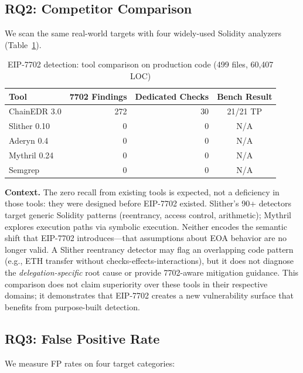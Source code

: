 \subsection{RQ2: Competitor Comparison}

We scan the same real-world targets with four widely-used Solidity analyzers (Table~\ref{tab:competitors}).

\begin{table}[h]
\centering
\caption{EIP-7702 detection: tool comparison on production code (499 files, 60{,}407 LOC)}
\label{tab:competitors}
\begin{tabular}{lrrc}
\hline
\textbf{Tool} & \textbf{7702 Findings} & \textbf{Dedicated Checks} & \textbf{Bench Result} \\
\hline
ChainEDR 3.0    & 272 & 30 & 21/21 TP \\
Slither 0.10    &   0 &  0 & N/A \\
Aderyn 0.4      &   0 &  0 & N/A \\
Mythril 0.24    &   0 &  0 & N/A \\
Semgrep         &   0 &  0 & N/A \\
\hline
\end{tabular}
\end{table}

\textbf{Context.} The zero recall from existing tools is expected, not a deficiency in those tools: they were designed before EIP-7702 existed. Slither's 90+ detectors target generic Solidity patterns (reentrancy, access control, arithmetic); Mythril explores execution paths via symbolic execution. Neither encodes the semantic shift that EIP-7702 introduces---that assumptions about EOA behavior are no longer valid. A Slither reentrancy detector may flag an overlapping code pattern (e.g., ETH transfer without checks-effects-interactions), but it does not diagnose the \textit{delegation-specific} root cause or provide 7702-aware mitigation guidance. This comparison does not claim superiority over these tools in their respective domains; it demonstrates that EIP-7702 creates a new vulnerability surface that benefits from purpose-built detection.

\subsection{RQ3: False Positive Rate}

We measure FP rates on four target categories:

